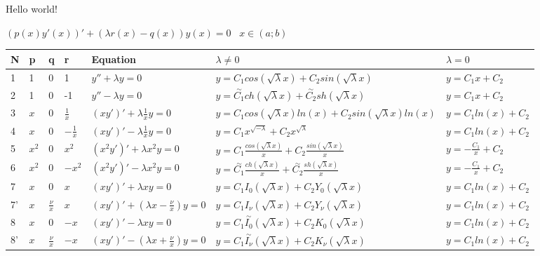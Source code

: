 \documentclass{article}
\begin{document}
\centering

Hello world! 

\Large

\begin{center}
  \( (p(x)y'(x))' + (\lambda r(x) - q(x))y(x) = 0 \;\;\; x \in (a;b) \)
\end{center}

\begin{center}
\begin{tabular}{|l|l|l|l|l|l|l|}
  \hline
  N & p & q & r & Equation & \( \lambda \neq 0 \) & \( \lambda = 0 \)\\
  \hline
  1 & 1 & 0 & 1 & 
  \( y'' + \lambda y = 0 \) & 
  \( y = C_1 cos(\sqrt{\lambda}x) + C_2 sin(\sqrt{\lambda} x) \) & 
  \( y = C_1 x + C_2 \) \\
  \hline
  2 & 1 & 0 & -1 & 
  \( y'' - \lambda y = 0 \) & 
  \( y = \overset{\sim}{C_1} ch(\sqrt{\lambda}x) + \overset{\sim}{C_2} sh(\sqrt{\lambda}x) \) & 
  \( y = C_1 x + C_2 \)  \\
  \hline
  3 & \( x \) & 0 & \( \frac{1}{x} \) &
  \( (xy')' + \lambda \frac{1}{x} y = 0 \) & 
  \( y = C_1 cos(\sqrt{\lambda}x) ln(x) + C_2 sin(\sqrt{\lambda} x) ln(x) \) &
  \( y = C_1 ln(x) + C_2 \) \\
  \hline
  4 & \( x \) & 0 & \( -\frac{1}{x} \) & 
  \( (xy')' - \lambda \frac{1}{x} y = 0 \) & 
  \( y = C_1 x^{\sqrt{-\lambda}} + C_2 x^{\sqrt{\lambda}} \) &
  \( y = C_1 ln(x) + C_2 \) \\
  \hline
  5 & \( x^2 \) & 0 & \( x^2 \) &
  \( (x^2 y')' + \lambda x^2 y = 0 \) &
  \( y = C_1 \frac{cos(\sqrt{\lambda}x)}{x} + C_2 \frac{sin(\sqrt{\lambda}x)}{x} \) &
  \( y = -\frac{C_1}{x} + C_2 \) \\
  \hline
  6 & \( x^2 \) & 0 & \( -x^2 \) &
  \( (x^2 y')' - \lambda x^2 y = 0 \) &
  \( y = \overset{\sim}{C_1} \frac{ch(\sqrt{\lambda}x)}{x} + \overset{\sim}{C_2} \frac{sh(\sqrt{\lambda}x)}{x} \) &
  \( y = -\frac{C_1}{x} + C_2 \) \\
  \hline
  7 & \( x \) & 0 & \( x \) &
  \( (x y')' + \lambda x y = 0 \) &
  \( y = C_1 I_0 (\sqrt{\lambda} x) + C_2 Y_0(\sqrt{\lambda} x) \) &
  \( y = C_1 ln(x) + C_2 \) \\
  \hline
  7' & \( x \) & \( \frac{\nu}{x} \) & \( x \) &
  \( (x y')' + (\lambda x - \frac{\nu}{x}) y = 0 \) &
  \( y = C_1 I_\nu (\sqrt{\lambda} x) + C_2 Y_\nu(\sqrt{\lambda} x) \) &
  \( y = C_1 ln(x) + C_2 \) \\
  \hline
  8 & \( x \) & 0 & \( -x \) &
  \( (x y')' - \lambda x y = 0 \) &
  \( y = C_1 \overset{\sim}{I_0} (\sqrt{\lambda} x) + C_2 K_0(\sqrt{\lambda} x) \) &
  \( y = C_1 ln(x) + C_2 \) \\
  \hline
  8' & \( x \) & \(\frac{\nu}{x} \) & \( -x \) &
  \( (x y')' - (\lambda x + \frac{\nu}{x}) y = 0 \) &
  \( y = C_1 \overset{\sim}{I_\nu} (\sqrt{\lambda} x) + C_2 K_\nu(\sqrt{\lambda} x) \) &
  \( y = C_1 ln(x) + C_2 \) \\
  \hline

\end{tabular}
\end{center}
\end{document}
